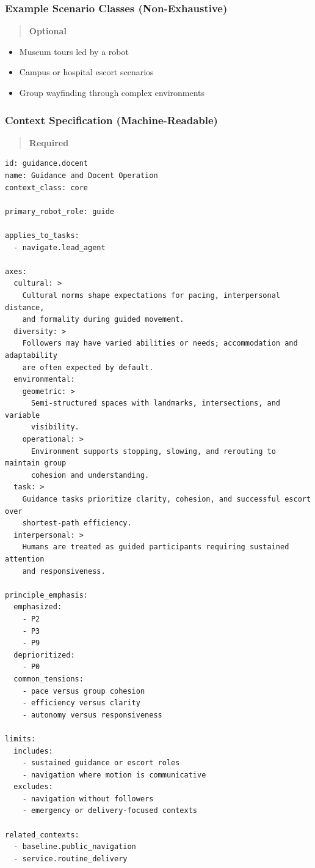 \documentclass[utf8]{frontiers_suppmat} %
\providecommand{\tightlist}{%
  \setlength{\itemsep}{0pt}\setlength{\parskip}{0pt}}
\begin{document}
\subsubsection{Example Scenario Classes
(Non-Exhaustive)}\label{example-scenario-classes-non-exhaustive}

\begin{quote}
\textbf{Optional}
\end{quote}

\begin{itemize}
\tightlist
\item
  Museum tours led by a robot
\item
  Campus or hospital escort scenarios
\item
  Group wayfinding through complex environments
\end{itemize}

\subsubsection{Context Specification
(Machine-Readable)}\label{context-specification-machine-readable}

\begin{quote}
\textbf{Required}
\end{quote}

\begin{lstlisting}[style=literatecard, label={context:guidance}]
id: guidance.docent
name: Guidance and Docent Operation
context_class: core

primary_robot_role: guide

applies_to_tasks:
  - navigate.lead_agent

axes:
  cultural: >
    Cultural norms shape expectations for pacing, interpersonal distance,
    and formality during guided movement.
  diversity: >
    Followers may have varied abilities or needs; accommodation and adaptability
    are often expected by default.
  environmental:
    geometric: >
      Semi-structured spaces with landmarks, intersections, and variable
      visibility.
    operational: >
      Environment supports stopping, slowing, and rerouting to maintain group
      cohesion and understanding.
  task: >
    Guidance tasks prioritize clarity, cohesion, and successful escort over
    shortest-path efficiency.
  interpersonal: >
    Humans are treated as guided participants requiring sustained attention
    and responsiveness.

principle_emphasis:
  emphasized:
    - P2
    - P3
    - P9
  deprioritized:
    - P0
  common_tensions:
    - pace versus group cohesion
    - efficiency versus clarity
    - autonomy versus responsiveness

limits:
  includes:
    - sustained guidance or escort roles
    - navigation where motion is communicative
  excludes:
    - navigation without followers
    - emergency or delivery-focused contexts

related_contexts:
  - baseline.public_navigation
  - service.routine_delivery
\end{lstlisting}
\end{document}
